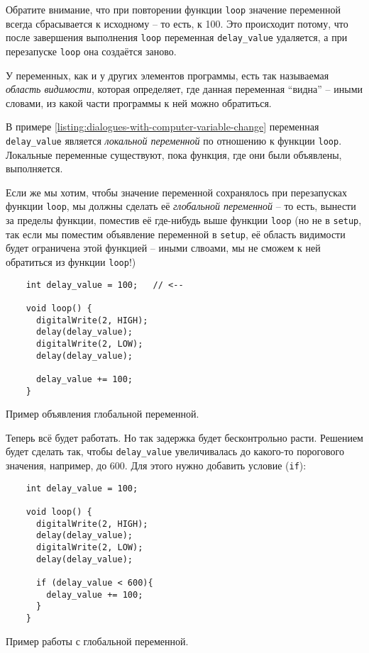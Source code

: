 \documentclass[../sparc.tex]{subfiles}
\begin{document}
Обратите внимание, что при повторении функции \texttt{loop} значение переменной
всегда сбрасывается к исходному -- то есть, к 100.  Это происходит потому, что
после завершения выполнения \texttt{loop} переменная \texttt{delay\_value}
удаляется, а при перезапуске \texttt{loop} она создаётся заново.

У переменных, как и у других элементов программы, есть так называемая
\emph{область видимости}, которая определяет, где данная переменная ``видна'' --
иными словами, из какой части программы к ней можно обратиться.

В примере \ref{listing:dialogues-with-computer-variable-change} переменная
\texttt{delay\_value} является \emph{локальной переменной} по отношению к
функции \texttt{loop}.  Локальные переменные существуют, пока функция, где они
были объявлены, выполняется.

Если же мы хотим, чтобы значение переменной сохранялось при перезапусках функции
\texttt{loop}, мы должны сделать её \emph{глобальной переменной} -- то есть,
вынести за пределы функции, поместив её где-нибудь выше функции \texttt{loop}
(но не в \texttt{setup}, так если мы поместим объявление переменной в
\texttt{setup}, её область видимости будет ограничена этой функцией -- иными
слвоами, мы не сможем к ней обратиться из функции \texttt{loop}!)

\begin{listing}[ht]
  \begin{verbatim}
    int delay_value = 100;   // <--

    void loop() {
      digitalWrite(2, HIGH);
      delay(delay_value);
      digitalWrite(2, LOW);
      delay(delay_value);

      delay_value += 100;
    }
  \end{verbatim}
  \label{listing:dialogues-with-computer-global-variable}
  \caption{Пример объявления глобальной переменной.}
\end{listing}

Теперь всё будет работать. Но так задержка будет бесконтрольно расти. Решением
будет сделать так, чтобы \texttt{delay\_value} увеличивалась до какого-то
порогового значения, например, до 600. Для этого нужно добавить условие
(\texttt{if}):

\begin{listing}[ht]
  \begin{verbatim}
    int delay_value = 100;

    void loop() {
      digitalWrite(2, HIGH);
      delay(delay_value);
      digitalWrite(2, LOW);
      delay(delay_value);

      if (delay_value < 600){
        delay_value += 100;
      }
    }
  \end{verbatim}
  \label{listing:dialogues-with-computer-global-variable-2}
  \caption{Пример работы с глобальной переменной.}
\end{listing}
\end{document}
